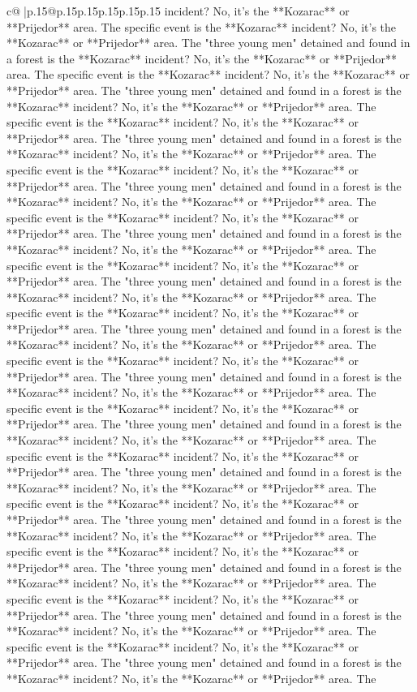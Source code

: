 \documentclass{article}
\begin{document}
{\begin{supertabular}{c@{$\;$}|p{.15\linewidth}@{}p{.15\linewidth}p{.15\linewidth}p{.15\linewidth}p{.15\linewidth}p{.15\linewidth}}
{{{incident? No, it's the **Kozarac** or **Prijedor** area. The specific event is the **Kozarac** incident? No, it's the **Kozarac** or **Prijedor** area. The "three young men" detained and found in a forest is the **Kozarac** incident? No, it's the **Kozarac** or **Prijedor** area. The specific event is the **Kozarac** incident? No, it's the **Kozarac** or **Prijedor** area. The "three young men" detained and found in a forest is the **Kozarac** incident? No, it's the **Kozarac** or **Prijedor** area. The specific event is the **Kozarac** incident? No, it's the **Kozarac** or **Prijedor** area. The "three young men" detained and found in a forest is the **Kozarac** incident? No, it's the **Kozarac** or **Prijedor** area. The specific event is the **Kozarac** incident? No, it's the **Kozarac** or **Prijedor** area. The "three young men" detained and found in a forest is the **Kozarac** incident? No, it's the **Kozarac** or **Prijedor** area. The specific event is the **Kozarac** incident? No, it's the **Kozarac** or **Prijedor** area. The "three young men" detained and found in a forest is the **Kozarac** incident? No, it's the **Kozarac** or **Prijedor** area. The specific event is the **Kozarac** incident? No, it's the **Kozarac** or **Prijedor** area. The "three young men" detained and found in a forest is the **Kozarac** incident? No, it's the **Kozarac** or **Prijedor** area. The specific event is the **Kozarac** incident? No, it's the **Kozarac** or **Prijedor** area. The "three young men" detained and found in a forest is the **Kozarac** incident? No, it's the **Kozarac** or **Prijedor** area. The specific event is the **Kozarac** incident? No, it's the **Kozarac** or **Prijedor** area. The "three young men" detained and found in a forest is the **Kozarac** incident? No, it's the **Kozarac** or **Prijedor** area. The specific event is the **Kozarac** incident? No, it's the **Kozarac** or **Prijedor** area. The "three young men" detained and found in a forest is the **Kozarac** incident? No, it's the **Kozarac** or **Prijedor** area. The specific event is the **Kozarac** incident? No, it's the **Kozarac** or **Prijedor** area. The "three young men" detained and found in a forest is the **Kozarac** incident? No, it's the **Kozarac** or **Prijedor** area. The specific event is the **Kozarac** incident? No, it's the **Kozarac** or **Prijedor** area. The "three young men" detained and found in a forest is the **Kozarac** incident? No, it's the **Kozarac** or **Prijedor** area. The specific event is the **Kozarac** incident? No, it's the **Kozarac** or **Prijedor** area. The "three young men" detained and found in a forest is the **Kozarac** incident? No, it's the **Kozarac** or **Prijedor** area. The specific event is the **Kozarac** incident? No, it's the **Kozarac** or **Prijedor** area. The "three young men" detained and found in a forest is the **Kozarac** incident? No, it's the **Kozarac** or **Prijedor** area. The specific event is the **Kozarac** incident? No, it's the **Kozarac** or **Prijedor** area. The "three young men" detained and found in a forest is the **Kozarac** incident? No, it's the **Kozarac** or **Prijedor** area. The }}}
\end{supertabular}}
\end{document}

